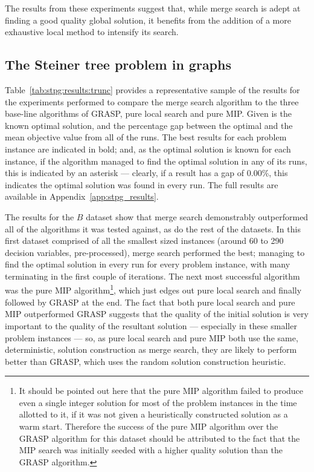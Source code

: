 \documentclass[preprint]{elsarticle}
\begin{document}
The results from these experiments suggest that, while merge search is adept at finding a good quality global solution, it benefits from the addition of a more exhaustive local method to intensify its search. 


\subsection{The Steiner tree problem in graphs}

Table~\ref{tab:stpg:results:trunc} provides a representative sample of the results for the experiments performed to compare the merge search algorithm to the three base-line algorithms of GRASP, pure local search and pure MIP. Given is the known optimal solution, and the percentage gap between the optimal and the mean objective value from all of the runs. The best results for each problem instance are indicated in bold; and, as the optimal solution is known for each instance, if the algorithm managed to find the optimal solution in any of its runs, this is indicated by an asterisk --- clearly, if a result has a gap of 0.00\%, this indicates the optimal solution was found in every run. The full results are available in Appendix~\ref{app:stpg_results}.


The results for the \(B\) dataset show that merge search demonstrably outperformed all of the algorithms it was tested against, as do the rest of the datasets. In this first dataset comprised of all the smallest sized instances (around 60 to 290 decision variables, pre-processed), merge search performed the best; managing to find the optimal solution in every run for every problem instance, with many terminating in the first couple of iterations. The next most successful algorithm was the pure MIP algorithm\footnote{It should be pointed out here that the pure MIP algorithm failed to produce even a single integer solution for most of the problem instances in the time allotted to it, if it was not given a heuristically constructed solution as a warm start. Therefore the success of the pure MIP algorithm over the GRASP algorithm for this dataset should be attributed to the fact that the MIP search was initially seeded with a higher quality solution than the GRASP algorithm.}, which just edges out pure local search and finally followed by GRASP at the end. The fact that both pure local search and pure MIP outperformed GRASP suggests that the quality of the initial solution is very important to the quality of the resultant solution --- especially in these smaller problem instances --- so, as pure local search and pure MIP both use the same, deterministic, solution construction as merge search, they are likely to perform better than GRASP, which uses the random solution construction heuristic.
\end{document}
